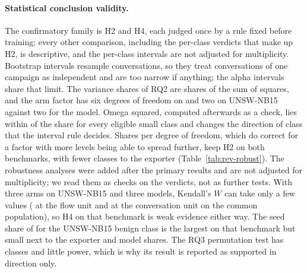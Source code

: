 \paragraph{Statistical conclusion validity.} The confirmatory family is H2 and H4, each judged once by a rule fixed before training; every other comparison, including the per-class verdicts that make up H2, is descriptive, and the per-class intervals are not adjusted for multiplicity. Bootstrap intervals resample conversations, so they treat conversations of one campaign as independent and are too narrow if anything; the alpha intervals share that limit. The variance shares of RQ2 are shares of the sum of squares, and the arm factor has six degrees of freedom on \cicids{} and two on UNSW-NB15 against two for the model. Omega squared, computed afterwards as a check, lies within \NomegaMaxGap{} of the share for every eligible small class and changes the direction of \NomegaChanged{} class that the interval rule decides. Shares per degree of freedom, which do correct for a factor with more levels being able to spread further, keep H2 on both benchmarks, with fewer \cicids{} classes to the exporter (Table~\ref{tab:rev-robust}). The robustness analyses were added after the primary results and are not adjusted for multiplicity; we read them as checks on the verdicts, not as further tests. With three arms on UNSW-NB15 and three models, Kendall's $W$ can take only a few values (\RQfourWFlowUnsw{} at the flow unit and \RQfourWConvUnsw{} at the conversation unit on the common population), so H4 on that benchmark is weak evidence either way. The seed share of \RQtwoSeedUnswBenign{} for the UNSW-NB15 benign class is the largest on that benchmark but small next to the exporter and model shares. The RQ3 permutation test has \RQthreeClasses{} classes and little power, which is why its result is reported as supported in direction only.
